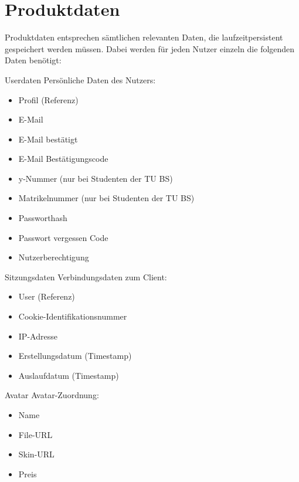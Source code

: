 
\chapter{Produktdaten}

Produktdaten entsprechen s\"amtlichen relevanten Daten, die laufzeitpersistent gespeichert werden müssen.
Dabei werden für jeden Nutzer einzeln die  folgenden Daten benötigt:

\begin{data}{10}{Userdaten}
	Persönliche Daten des Nutzers:
	\begin{itemize}
		\item Profil (Referenz)
		\item E-Mail
		\item E-Mail bestätigt
		\item E-Mail Bestätigungscode
		\item y-Nummer (nur bei Studenten der TU BS)
		\item Matrikelnummer (nur bei Studenten der TU BS)
		\item Passworthash
		\item Passwort vergessen Code
		\item Nutzerberechtigung
	\end{itemize}
\end{data}

\begin{data}{20}{Sitzungsdaten}
	Verbindungsdaten zum Client:
	\begin{itemize}
		\item User (Referenz)
		\item Cookie-Identifikationsnummer
		\item IP-Adresse
		\item Erstellungsdatum (Timestamp)
		\item Auslaufdatum (Timestamp)
	\end{itemize}
\end{data}

\begin{data}{30}{Avatar}
	Avatar-Zuordnung:
	\begin{itemize}
		\item Name
		\item File-URL
		\item Skin-URL
		\item Preis
	\end{itemize}
\end{data}


